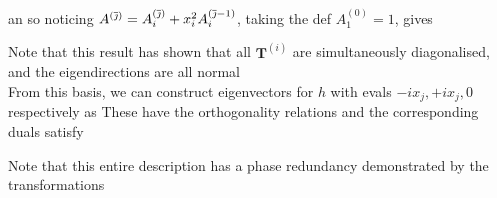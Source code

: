 \documentclass{article}
\begin{document}
an so noticing $A^{({\overline{\jmath}})} = A_i^{({\overline{\jmath}})} + x_i^2 A^{({\overline{\jmath}}-1)}_i$, taking the def $A^{(0)}_1 = 1$,  gives 

Note that this result has shown that all $\bm{T}^{(i)}$ are simultaneously diagonalised, and the eigendirections are all normal \\
From this basis, we can construct eigenvectors for $h$ with evals $-ix_j, +ix_j, 0$ respectively as 
These have the orthogonality relations 
and the corresponding duals satisfy 
\begin{remark}
Note that this entire description has a phase redundancy demonstrated by the transformations
\end{remark}
\end{document}
